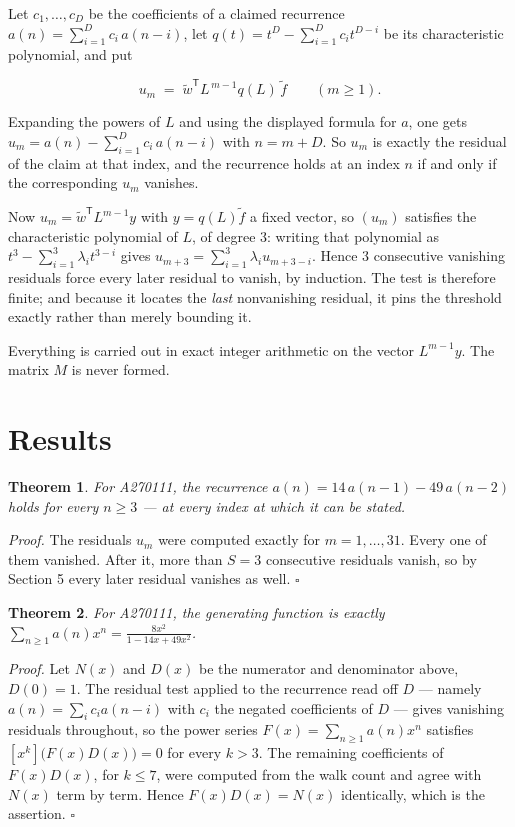 \documentclass[11pt]{article}
\newtheorem{theorem}{Theorem}
\theoremstyle{definition}
\begin{document}
Let $c_1,\dots,c_D$ be the coefficients of a claimed recurrence $a(n) = \sum_{i=1}^{D} c_i\,a(n-i)$, let $q(t) = t^{D} - \sum_{i=1}^{D} c_i t^{D-i}$ be its characteristic polynomial, and put

\[u_m \;=\; \tilde w^{\mathsf T} L^{\,m-1} q(L)\,\tilde f \qquad (m \ge 1).\]

Expanding the powers of $L$ and using the displayed formula for $a$, one gets $u_m = a(n) - \sum_{i=1}^{D} c_i\,a(n-i)$ with $n = m + D$. So $u_m$ is exactly the residual of the claim at that index, and the recurrence holds at an index $n$ if and only if the corresponding $u_m$ vanishes.

Now $u_m = \tilde w^{\mathsf T} L^{m-1} y$ with $y = q(L)\tilde f$ a fixed vector, so $(u_m)$ satisfies the characteristic polynomial of $L$, of degree $3$: writing that polynomial as $t^{3} - \sum_{i=1}^{3} \lambda_i t^{3-i}$ gives $u_{m+3} = \sum_{i=1}^{3} \lambda_i u_{m+3-i}$. Hence $3$ consecutive vanishing residuals force every later residual to vanish, by induction. The test is therefore finite; and because it locates the {\itshape last} nonvanishing residual, it pins the threshold exactly rather than merely bounding it.

Everything is carried out in exact integer arithmetic on the vector $L^{m-1}y$. The matrix $M$ is never formed.

\section{Results}

\begin{theorem} For A270111, the recurrence $a(n) = 14\,a(n-1) - 49\,a(n-2)$ holds for every $n \ge 3$ --- at every index at which it can be stated.\end{theorem}

{\itshape Proof.} The residuals $u_m$ were computed exactly for $m = 1,\dots,31$. Every one of them vanished. After it, more than $S = 3$ consecutive residuals vanish, so by Section 5 every later residual vanishes as well. $\square$

\begin{theorem} For A270111, the generating function is exactly $\sum_{n\ge 1} a(n)x^n = \frac{8x^{2}}{1 - 14x + 49x^{2}}$.\end{theorem}

{\itshape Proof.} Let $N(x)$ and $D(x)$ be the numerator and denominator above, $D(0)=1$. The residual test applied to the recurrence read off $D$ --- namely $a(n) = \sum_i c_i a(n-i)$ with $c_i$ the negated coefficients of $D$ --- gives vanishing residuals throughout, so the power series $F(x)=\sum_{n\ge 1}a(n)x^n$ satisfies $[x^k]\bigl(F(x)D(x)\bigr) = 0$ for every $k > 3$. The remaining coefficients of $F(x)D(x)$, for $k \le 7$, were computed from the walk count and agree with $N(x)$ term by term. Hence $F(x)D(x) = N(x)$ identically, which is the assertion. $\square$
\end{document}
